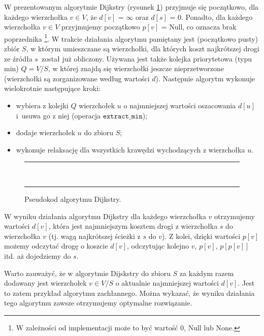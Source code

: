 \documentclass[12pt,a4paper]{book}
\newenvironment{myalgorithm}
{\rule{\textwidth}{0.5mm}\\\SetAlCapSty{}\SetAlgoNoEnd\SetAlgoNoLine\begin{algorithm}}{\end{algorithm}\rule{\textwidth}{0.5mm}}
\theoremstyle{definition}
\numberwithin{equation}{chapter}
\begin{document}
W prezentowanym algorytmie Dijkstry (rysunek \ref{Dijkstra_pseudokod}) przyjmuje się początkowo, dla każdego wierzchołka $v\in V$, że $d[v]$ = $\infty$ oraz $d[s]$ = 0. Ponadto, dla każdego wierzchołka $v \in V$ przyjmujemy początkowo $p[v]$ = $\mbox{Null}$, co oznacza brak poprzednika \footnote{W zależności od implementacji może to być wartość $0$, $\mbox{Null}$ lub $\mbox{None}$.}. W trakcie działania algorytmu pamiętany jest (początkowo pusty) zbiór $S$, w którym umieszczane są wierzchołki, dla których koszt najkrótszej drogi ze źródła $s$~został już obliczony. Używana jest także  kolejka priorytetowa (typu min) $Q = V/S$, w której znajdą się wierzchołki jeszcze nieprzetworzone (wierzchołki są zorganizowane według wartości $d$).  Następnie algorytm wykonuje wielokrotnie następujące kroki: 
\begin{itemize}
\item wybiera z kolejki $Q$ wierzchołek $u$ o najmniejszej wartości oszacowania $d[u]$ i~usuwa go z niej (operacja $\texttt{extract\_min}$);
\item dodaje wierzchołek $u$ do zbioru $S$;
\item wykonuje relaksację dla wszystkich krawędzi wychodzących z wierzchołka $u$.
\end{itemize}

\begin{figure}[ht]
\begin{myalgorithm}[H]
	\DontPrintSemicolon
\end{myalgorithm}
\caption{Pseudokod algorytmu Dijkstry.}
\label{Dijkstra_pseudokod}
\end{figure}

W wyniku działania algorytmu Dijkstry dla każdego wierzchołka $v$ otrzymujemy wartości $d[v]$, która jest najmniejszym kosztem drogi z wierzchołka $s$ do wierzchołka $v$ (tj. wagą najkrótszej ścieżki z $s$ do $v$).  Z kolei, dzięki wartości $p[v]$ możemy odczytać drogę o koszcie $d[v]$, odczytując kolejno $v$, $p[v]$, $p[p[v]]$ itd. aż dojedziemy do $s$.

Warto zauważyć, że w algorytmie Dijskstry do zbioru $S$ za każdym razem dodawany jest wierzchołek $v \in V/S$ o aktualnie najmniejszej wartości $d[v]$. Jest to zatem przykład algorytmu zachłannego. Można wykazać, że wyniku działania tego algorytmu zawsze otrzymujemy optymalne rozwiązanie.
\end{document}
